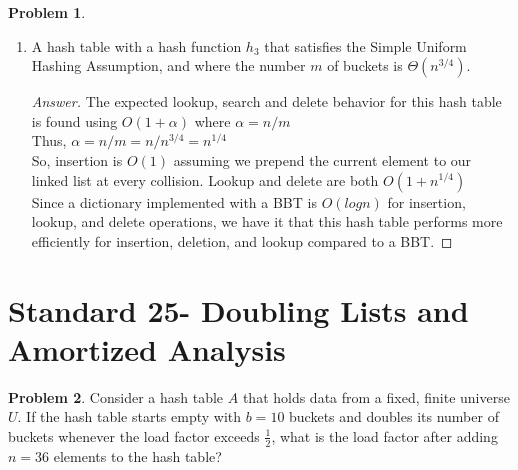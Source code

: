 \documentclass[11pt]{article}
\theoremstyle{definition}
\theoremstyle{definition}
\newtheorem{required}{Problem}
\theoremstyle{definition}
\begin{document}
\begin{required}
\begin{enumerate}[label=(\alph*)]
\begin{proof}[Answer]
\end{proof}


\vskip 15pt	
\item A hash table with a hash function $h_3$ that satisfies the Simple Uniform Hashing Assumption, and where the number $m$ of buckets is $\Theta(n^{3/4})$.

\begin{proof}[Answer]
The expected lookup, search and delete behavior for this hash table is found using $O(1+\alpha)$ where $\alpha= n/m$ \\
Thus, $\alpha= n/m = n/n^{3/4}=n^{1/4}$ \\
So, insertion is $O(1)$ assuming we prepend the current element to our linked list at every collision. Lookup and delete are both $O(1+n^{1/4})$ \\
Since a dictionary implemented with a BBT is $O(logn)$ for insertion, lookup, and delete operations, we have it that this hash table performs more efficiently for insertion, deletion, and lookup compared to a BBT.


\end{proof}

\end{enumerate}
\end{required}



\newpage
\section{Standard 25- Doubling Lists and Amortized Analysis}

\begin{required} \label{Hash2}
Consider a hash table $A$ that holds data from a fixed, finite universe $U$. If the hash table starts empty with $b=10$ buckets and doubles its number of buckets whenever the load factor exceeds $\frac{1}{2}$, what is the load factor after adding $n = 36$ elements to the hash table?
\end{required}
\end{document}
